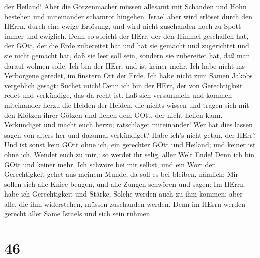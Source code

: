 der Heiland!  Aber die Götzenmacher müssen allesamt mit
Schanden und Hohn bestehen und miteinander schamrot hingehen.
 Israel aber wird erlöset durch den HErrn, durch eine ewige
Erlösung, und wird nicht zuschanden noch zu Spott immer und ewiglich.
 Denn so spricht der HErr, der den Himmel geschaffen hat,
der GOtt, der die Erde zubereitet hat und hat sie gemacht und
zugerichtet und sie nicht gemacht hat, daß sie leer soll sein, sondern
sie zubereitet hat, daß man darauf wohnen solle: Ich bin der HErr, und
ist keiner mehr.  Ich habe nicht ins Verborgene geredet, im
finstern Ort der Erde. Ich habe nicht zum Samen Jakobs vergeblich
gesagt: Suchet mich! Denn ich bin der HErr, der von Gerechtigkeit redet
und verkündige, das da recht ist.  Laß sich versammeln und
kommen miteinander herzu die Helden der Heiden, die nichts wissen und
tragen sich mit den Klötzen ihrer Götzen und flehen dem GOtt, der nicht
helfen kann.  Verkündiget und macht euch herzu; ratschlaget
miteinander! Wer hat dies lassen sagen von alters her und dazumal
verkündiget? Habe ich's nicht getan, der HErr? Und ist sonst kein GOtt
ohne ich, ein gerechter GOtt und Heiland; und keiner ist ohne ich.
 Wendet euch zu mir,: so werdet ihr selig, aller Welt Ende!
Denn ich bin GOtt und keiner mehr.  Ich schwöre bei mir
selbst, und ein Wort der Gerechtigkeit gehet aus meinem Munde, da soll
es bei bleiben, nämlich: Mir sollen sich alle Kniee beugen, und alle
Zungen schwören  und sagen: Im HErrn habe ich Gerechtigkeit
und Stärke. Solche werden auch zu ihm kommen; aber alle, die ihm
widerstehen, müssen zuschanden werden.  Denn im HErrn
werden gerecht aller Same Israels und sich sein rühmen.

\hypertarget{section-45}{%
\section{46}\label{section-45}}

